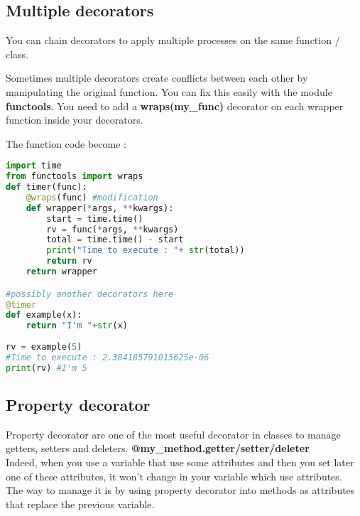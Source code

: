 \documentclass[a4paper, 12pt, titlepage]{scrartcl} %
\begin{document}
\subsection{Multiple decorators}
You can chain decorators to apply multiple processes on the same function / class. 

\vspace{5mm}

Sometimes multiple decorators create conflicts between each other by manipulating the original function. You can fix this easily with the module \textbf{functools}. You need to add a \textbf{wraps(my\_func)} decorator on each wrapper function inside your decorators.

\vspace{5mm}

The function code become :
\begin{lstlisting}[language=Python]
import time
from functools import wraps
def timer(func):
    @wraps(func) #modification
	def wrapper(*args, **kwargs):
		start = time.time()
		rv = func(*args, **kwargs)
		total = time.time() - start
		print("Time to execute : "+ str(total))
		return rv
	return wrapper

#possibly another decorators here
@timer
def example(x):
	return "I'm "+str(x)
	
rv = example(5)
#Time to execute : 2.384185791015625e-06
print(rv) #I'm 5
\end{lstlisting} \vspace{5mm}

\subsection{Property decorator}
\label{subsec:Property}
Property decorator are one of the most useful decorator in classes to manage getters, setters and deleters. \textbf{@my\_method.getter/setter/deleter}\\
Indeed, when you use a variable that use some attributes and then you set later one of these attributes, it won't change in your variable which use attributes. \\
The way to manage it is by using property decorator into methods as attributes that replace the previous variable.

\vspace{5mm}
\end{document}
